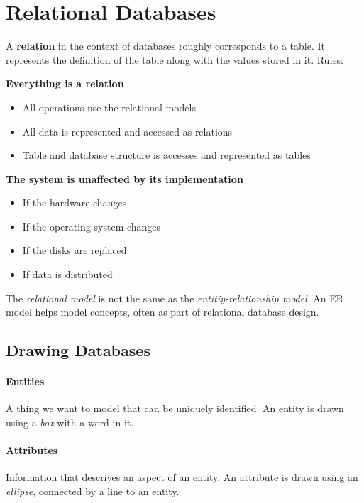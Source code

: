 \section{Relational Databases}

A \textbf{relation} in the context of databases roughly corresponds to a table. It represents the definition of the table along with the values stored in it. Rules:

\textbf{Everything is a relation}

\begin{itemize}
	\item All operations use the relational models
	\item All data is represented and accessed as relations
	\item Table and database structure is accesses and represented as tables
\end{itemize}

\textbf{The system is unaffected by its implementation}

\begin{itemize}
	\item If the hardware changes 
	\item If the operating system changes 
	\item If the disks are replaced
	\item If data is distributed 
\end{itemize}

The \textit{relational model} is not the same as the \textit{entitiy-relationship model}. An ER model helps model concepts, often as part of relational database design.

\subsection{Drawing Databases}

\paragraph{Entities} A thing we want to model that can be uniquely identified. An entity is drawn using a \textit{box} with a word in it.

\paragraph{Attributes} Information that descrives an aspect of an entity. An attribute is drawn using an \textit{ellipse}, connected by a line to an entity.

